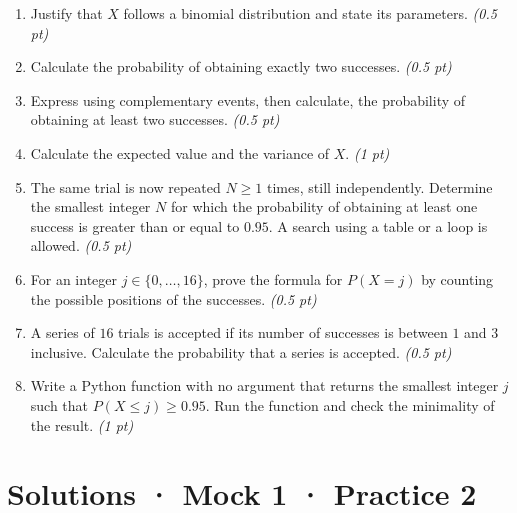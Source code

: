 \begin{enumerate}

\item Justify that $X$ follows a binomial distribution and state its parameters. \hfill\textit{(0.5 pt)}

\item Calculate the probability of obtaining exactly two successes. \hfill\textit{(0.5 pt)}

\item Express using complementary events, then calculate, the probability of obtaining at least two successes. \hfill\textit{(0.5 pt)}

\item Calculate the expected value and the variance of $X$. \hfill\textit{(1 pt)}

\item The same trial is now repeated $N\ge1$ times, still independently. Determine the smallest integer $N$ for which the probability of obtaining at least one success is greater than or equal to $\num{0,95}$. A search using a table or a loop is allowed. \hfill\textit{(0.5 pt)}

\item For an integer $j\in\{0,\ldots,16\}$, prove the formula for $P(X=j)$ by counting the possible positions of the successes. \hfill\textit{(0.5 pt)}

\item A series of $16$ trials is accepted if its number of successes is between $1$ and $3$ inclusive. Calculate the probability that a series is accepted. \hfill\textit{(0.5 pt)}

\item Write a Python function with no argument that returns the smallest integer $j$ such that $P(X\le j)\ge\num{0,95}$. Run the function and check the minimality of the result. \hfill\textit{(1 pt)}

\end{enumerate}

\ifmxteacher\mxnewpage

\section*{Solutions · Mock 1 · Practice 2}\label{cor:5-2}

